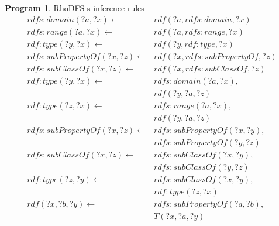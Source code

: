 \documentclass[sigconf,screen,review=false,natbib]{acmart}
\theoremstyle{definition}
\newtheorem{prog}{Program}[section]
\begin{document}
\begin{prog}{RhoDFS-s inference rules}
	\begin{align*}
		rdfs:domain(?a, ?x) \leftarrow        & rdf(?a, rdfs:domain, ?x)        \\
		rdfs:range(?a, ?x) \leftarrow         & rdf(?a, rdfs:range, ?x)         \\
		rdf:type(?y, ?x) \leftarrow           & rdf(?y, rdf:type, ?x)           \\
		rdfs:subPropertyOf(?x, ?z) \leftarrow & rdf(?x, rdfs:subPropertyOf, ?z) \\
		rdfs:subClassOf(?x, ?z) \leftarrow    & rdf(?x, rdfs:subClassOf, ?z)    \\
		rdf:type(?y, ?x) \leftarrow           & rdfs:domain(?a, ?x),            \\
		                                      & rdf(?y, ?a, ?z)                 \\
		rdf:type(?z, ?x) \leftarrow           & rdfs:range(?a, ?x),             \\
		                                      & rdf(?y, ?a, ?z)                 \\
		rdfs:subPropertyOf(?x, ?z) \leftarrow & rdfs:subPropertyOf(?x, ?y),     \\
		                                      & rdfs:subPropertyOf(?y, ?z)      \\
		rdfs:subClassOf(?x, ?z) \leftarrow    & rdfs:subClassOf(?x, ?y),        \\
		                                      & rdfs:subClassOf(?y, ?z)         \\
		rdf:type(?z, ?y) \leftarrow           & rdfs:subClassOf(?x, ?y),        \\
		                                      & rdf:type(?z, ?x)                \\
		rdf(?x, ?b, ?y) \leftarrow            & rdfs:subPropertyOf(?a, ?b),     \\
		                                      & T(?x, ?a, ?y)
	\end{align*}
	\label{program:rhodfss}
\end{prog}
\end{document}
